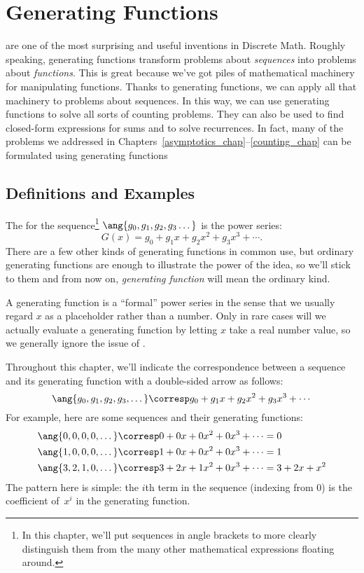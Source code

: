 \chapter{Generating Functions}\label{generating_function_chap}

 are one of the most surprising and useful
inventions in Discrete Math.  Roughly speaking, generating functions
transform problems about \emph{sequences} into problems about
\emph{functions}.  This is great because we've got piles of mathematical
machinery for manipulating functions.  Thanks to generating functions, we
can apply all that machinery to problems about sequences.  In this way, we
can use generating functions to solve all sorts of counting problems.
They can also be used to find closed-form expressions for sums and to
solve recurrences.  In fact, many of the problems we addressed in
Chapters~\hbox{\ref{asymptotics_chap}--\ref{counting_chap}} can be
formulated using generating functions\cutoff

\section{Definitions and Examples}

The  for the sequence\footnote{In
  this chapter, we'll put sequences in angle brackets to more clearly
  distinguish them from the many other mathematical expressions
  floating around.} $\ang{g_0, g_1, g_2, g_3 \dots}$ is the power
series:
\[
G(x) = g_0 + g_1 x + g_2 x^2 + g_3 x^3 + \cdots.
\]
There are a few other kinds of generating functions in common use, but
ordinary generating functions are enough to illustrate the power of
the idea, so we'll stick to them and from now on, \emph{generating
  function} will mean the ordinary kind.

A generating function is a ``formal'' power series in the sense that we
usually regard $x$ as a placeholder rather than a number.  Only in rare
cases will we actually evaluate a generating function by letting $x$ take
a real number value, so we generally ignore the issue of .

Throughout this chapter, we'll indicate the correspondence between a
sequence and its generating function with a double-sided arrow as
follows:
%
\[
\ang{g_0, g_1, g_2, g_3, \dots}
    \corresp g_0 + g_1 x + g_2 x^2 + g_3 x^3 + \cdots
\]
%
For example, here are some sequences and their generating functions:
%
\begin{align*}
\ang{0, 0, 0, 0, \dots}
    & \corresp 0 + 0 x + 0 x^2 + 0 x^3 + \cdots = 0 \\
\ang{1, 0, 0, 0, \dots}
    & \corresp 1 + 0 x + 0 x^2 + 0 x^3 + \cdots = 1 \\
\ang{3, 2, 1, 0, \dots}
    & \corresp 3 + 2 x + 1 x^2 + 0 x^3 + \cdots = 3 + 2 x + x^2
\end{align*}
%
The pattern here is simple: the $i$th term in the sequence (indexing
from 0) is the coefficient of~$x^i$ in the generating function.

